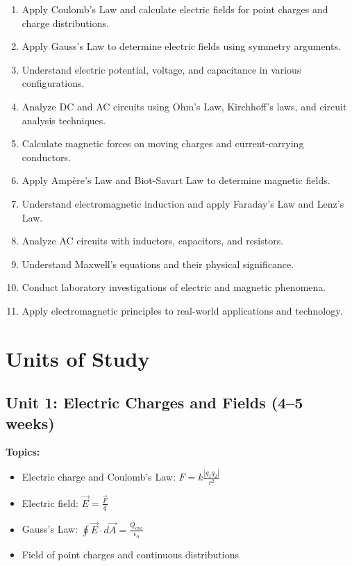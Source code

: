 \documentclass[12pt,oneside]{book}
\begin{document}
\begin{enumerate}
    \item Apply Coulomb's Law and calculate electric fields for point charges and charge distributions.
    \item Apply Gauss's Law to determine electric fields using symmetry arguments.
    \item Understand electric potential, voltage, and capacitance in various configurations.
    \item Analyze DC and AC circuits using Ohm's Law, Kirchhoff's laws, and circuit analysis techniques.
    \item Calculate magnetic forces on moving charges and current-carrying conductors.
    \item Apply Ampère's Law and Biot-Savart Law to determine magnetic fields.
    \item Understand electromagnetic induction and apply Faraday's Law and Lenz's Law.
    \item Analyze AC circuits with inductors, capacitors, and resistors.
    \item Understand Maxwell's equations and their physical significance.
    \item Conduct laboratory investigations of electric and magnetic phenomena.
    \item Apply electromagnetic principles to real-world applications and technology.
\end{enumerate}


\section{Units of Study}

\subsection{Unit 1: Electric Charges and Fields (4--5 weeks)}

\textbf{Topics:}
\begin{itemize}
    \item Electric charge and Coulomb's Law: $F = k\frac{|q_1 q_2|}{r^2}$
    \item Electric field: $\vec{E} = \frac{\vec{F}}{q}$
    \item Gauss's Law: $\oint \vec{E} \cdot d\vec{A} = \frac{Q_{enc}}{\epsilon_0}$
    \item Field of point charges and continuous distributions
\end{itemize}
\end{document}
